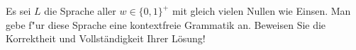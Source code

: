 \begin{exercise}

Es sei $L$ die Sprache aller $w \in \{ 0, 1 \}^{ + } $ mit
  gleich vielen Nullen wie Einsen. Man gebe f"ur diese Sprache eine
  kontextfreie Grammatik an.
  Beweisen Sie die Korrektheit und Vollst\"andigkeit Ihrer L\"osung!
\end{exercise}
